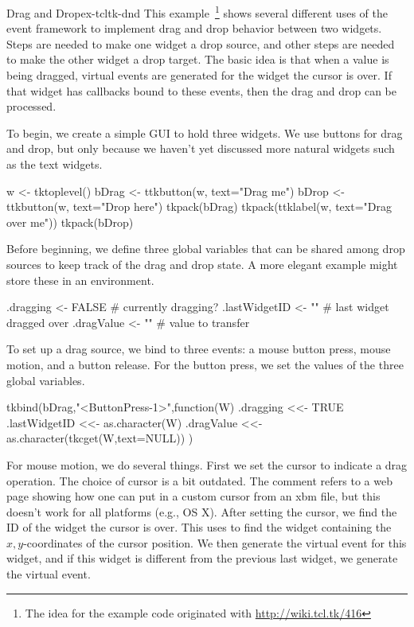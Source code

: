 \begin{example}{Drag and Drop}{ex-tcltk-dnd}
This example~\footnote{The idea for the example code originated with
  \url{http://wiki.tcl.tk/416}} shows several different uses of the
event framework to implement drag and drop behavior between two
widgets. Steps are needed to make one widget a drop source, and other
steps are needed to make the other widget a drop target. The basic
idea is that when a value is being dragged, virtual events are
generated for the widget the cursor is over. If that widget has
callbacks bound to these events, then the drag and drop can be
processed.


To begin, we create a simple GUI to hold three widgets. We use buttons
for drag and drop, but only because we haven't yet discussed more
natural widgets such as the text widgets. 

\begin{Schunk}
\begin{Sinput}
 w <- tktoplevel()
 bDrag <- ttkbutton(w, text="Drag me")
 bDrop <- ttkbutton(w, text="Drop here")
 tkpack(bDrag)
 tkpack(ttklabel(w, text="Drag over me"))
 tkpack(bDrop)
\end{Sinput}
\end{Schunk}


Before beginning, we define three global variables that can be shared
among drop sources to keep track of the drag and drop state. A more
elegant example might store these in an environment.
\begin{Schunk}
\begin{Sinput}
 .dragging <- FALSE                 # currently dragging?
 .lastWidgetID <- ""                # last widget dragged over
 .dragValue <- ""                   # value to transfer
\end{Sinput}
\end{Schunk}

%
To set up a drag source, we bind to three events: a mouse button
press, mouse motion, and a button release. For the button press, we
set the values of the three global variables.
\begin{Schunk}
\begin{Sinput}
 tkbind(bDrag,"<ButtonPress-1>",function(W) {
   .dragging <<-  TRUE
   .lastWidgetID <<- as.character(W)
   .dragValue <<- as.character(tkcget(W,text=NULL))
 })
\end{Sinput}
\end{Schunk}
%
%
For mouse motion, we do several things. First we set the cursor to
indicate a drag operation. The choice of cursor is a bit outdated. The
comment refers to a web page showing how one can put in a custom
cursor from an xbm file, but this doesn't work for all platforms
(e.g., OS X). After setting the cursor, we find the ID of the widget
the cursor is over. This uses  to find the widget
containing the $x,y$-coordinates of the cursor position.  We then
generate the  virtual event for this widget,
and if this widget is different from the previous last widget, we
generate the  virtual event.


\end{example}
